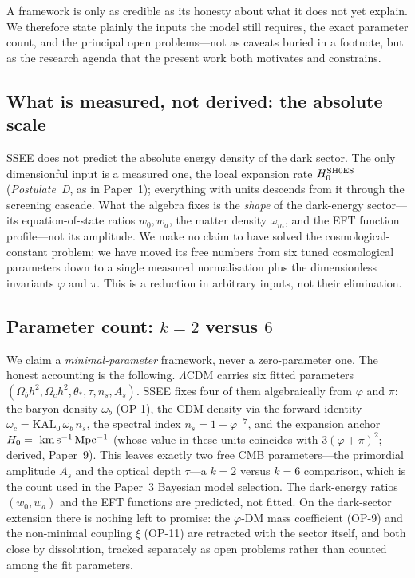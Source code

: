 \documentclass[a4paper,11pt]{article}
\newcommand{\kms}{\mathrm{km\,s^{-1}\,Mpc^{-1}}}
\begin{document}
A framework is only as credible as its honesty about what it does not yet
explain. We therefore state plainly the inputs the model still requires, the
exact parameter count, and the principal open problems---not as caveats buried
in a footnote, but as the research agenda that the present work both motivates
and constrains.

\subsection{What is measured, not derived: the absolute scale}

SSEE does not predict the absolute energy density of the dark sector. The
only dimensionful input is a measured one, the local expansion rate
$H_0^{\rm SH0ES}$ (\emph{Postulate~D}, as in Paper~1); everything with units descends
from it through the screening cascade.
What the algebra fixes is the \emph{shape} of the dark-energy sector---its
equation-of-state ratios $w_0,w_a$, the matter density $\omega_m$, and the EFT
function profile---not its amplitude. We make no claim to have solved the
cosmological-constant problem; we have moved its free numbers from six tuned
cosmological parameters down to a single measured normalisation plus the
dimensionless invariants $\varphi$ and $\pi$. This is a reduction in arbitrary
inputs, not their elimination.

\subsection{Parameter count: $k=2$ versus $6$}

We claim a \emph{minimal-parameter} framework, never a zero-parameter one. The
honest accounting is the following. $\Lambda$CDM carries six fitted parameters
$(\Omega_b h^2,\Omega_c h^2,\theta_*,\tau,n_s,A_s)$. SSEE fixes four of them
algebraically from $\varphi$ and $\pi$: the baryon density $\omega_b$ (OP-1), the
CDM density via the forward identity $\omega_c=\mathrm{KAL}_0\,\omega_b\,n_s$, the
spectral index $n_s=1-\varphi^{-7}$, and the expansion anchor $H_0=\val{H0_GLOBAL_d3}~\kms$
(whose value in these units coincides with $3(\varphi+\pi)^2$; derived, Paper~9). This leaves exactly two free CMB parameters---the primordial
amplitude $A_s$ and the optical depth $\tau$---a $k=2$ versus $k=6$ comparison,
which is the count used in the Paper~3 Bayesian model selection. The dark-energy
ratios $(w_0,w_a)$ and the EFT functions are predicted, not fitted. On the
dark-sector extension there is nothing left to promise: the $\varphi$-DM mass
coefficient (OP-9) and the non-minimal coupling $\xi$ (OP-11) are retracted
with the sector itself, and both close by dissolution, tracked separately
as open problems rather than counted among the fit parameters.
\end{document}
